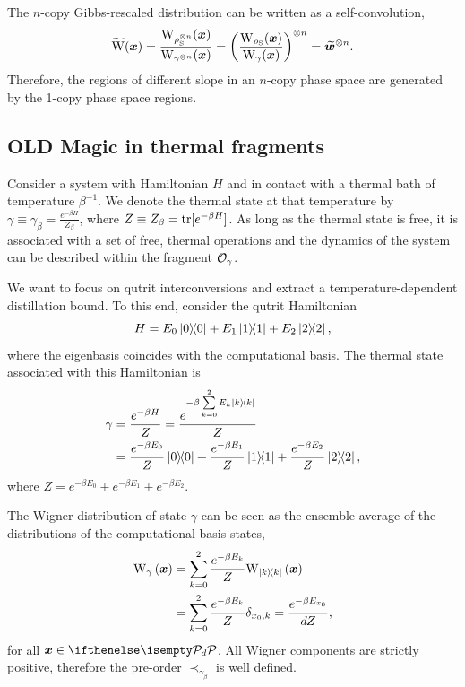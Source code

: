 \documentclass[pra,
aps,
twocolumn,
superscriptaddress,
groupedaddress,
nofootinbib,
reprint
]{revtex4-1}
\begin{document}
The $n$-copy Gibbs-rescaled distribution can be written as a self-convolution,
\begin{equation}
	\widetilde{\rm{W}}(\bmx) = \frac{\W{\noisys\too{n}}(\bmx)}{\W{\gamma\too{n}}(\bmx)} = \left( \frac{\W{\noisys}(\bmx)}{\W{\gamma}(\bmx)} \right)\too{n} = \widetilde{\bmw}\too{n}.
\end{equation}
Therefore, the regions of different slope in an $n$-copy phase space are generated by the 1-copy phase space regions.







\subsection{OLD Magic in thermal fragments}

Consider a system with Hamiltonian $H$ and in contact with a thermal bath of temperature $\beta^{-1}$.
We denote the thermal state at that temperature by $\gamma \equiv \gamma_\beta = \frac{e^{-\beta H}}{Z_\beta}$, where $Z \equiv Z_\beta = {\rm{tr}}[e^{-\beta H}]$.
As long as the thermal state is free, it is associated with a set of free, thermal operations and the dynamics of the system can be described within the fragment $\mathcal{O}_{\gamma}$.

We want to focus on qutrit interconversions and extract a temperature-dependent distillation bound.
To this end, consider the qutrit Hamiltonian
\begin{equation}
	H = E_0 \ketbra{0} + E_1 \ketbra{1} + E_2 \ketbra{2},
\end{equation}
where the eigenbasis coincides with the computational basis.
The thermal state associated with this Hamiltonian is
\begin{align}
	\gamma &= \frac{e^{-\beta H}}{Z} = \frac{e^{-\beta \sum\limits_{k=0}^2 E_k \ketbra{k}}}{Z} \\
	&= \frac{e^{-\beta E_0}}{Z}\ketbra{0} + \frac{e^{-\beta E_1}}{Z}\ketbra{1} + \frac{e^{-\beta E_2}}{Z}\ketbra{2},
\end{align}
where $Z = e^{-\beta E_0} + e^{-\beta E_1} + e^{-\beta E_2}$.

The Wigner distribution of state $\gamma$ can be seen as the ensemble average of the distributions of the computational basis states,
\begin{align}
	\W[\bmx]{\gamma} &= \sum\limits_{k=0}^2 \frac{e^{-\beta E_k}}{Z}\W[\bmx]{\ketbra{k}} \\
	&= \sum\limits_{k=0}^2 \frac{e^{-\beta E_k}}{Z} \delta_{x_0, k} = \frac{e^{-\beta E_{x_0}}}{dZ},
\end{align}
for all $\bmx \in \pd$. 
All Wigner components are strictly positive, therefore the pre-order $\prec_{\gamma_\beta}$ is well defined.
\end{document}

